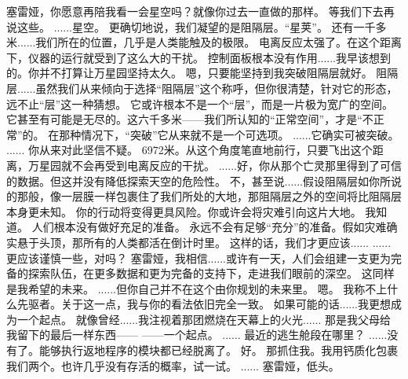 \documentclass[openany]{book}
\begin{document}
\begin{dialogue}
     塞雷娅，你愿意再陪我看一会星空吗？就像你过去一直做的那样。
     等我们下去再说这些。
     ......星空。
     更确切地说，我们凝望的是阻隔层。“星荚”。
     还有一千多米......我们所在的位置，几乎是人类能触及的极限。
     电离反应太强了。在这个距离下，仪器的运行就受到了这么大的干扰。
     控制面板根本没有作用......我早该想到的。你并不打算让万星园坚持太久。
     嗯，只要能坚持到我突破阻隔层就好。
     阻隔层......虽然我们从来倾向于选择“阻隔层”这个称呼，但你很清楚，针对它的形态，远不止“层”这一种猜想。
     它或许根本不是一个“层”，而是一片极为宽广的空间。
     它甚至有可能是无尽的。这六千多米——我们所认知的“正常空间”，才是“不正常”的。
     在那种情况下，“突破”它从来就不是一个可选项。
     ......它确实可被突破。
     ......
     你从来对此坚信不疑。
     6972米。从这个角度笔直地前行，只要飞出这个距离，万星园就不会再受到电离反应的干扰。
     ......好，你从那个亡灵那里得到了可信的数据。但这并没有降低探索天空的危险性。
     不，甚至说......假设阻隔层如你所说的那般，像一层膜一样包裹住了我们所处的大地，那阻隔层之外的空间将比阻隔层本身更未知。
     你的行动将变得更具风险。你或许会将灾难引向这片大地。
     我知道。
     人们根本没有做好充足的准备。
     永远不会有足够“充分”的准备。假如灾难确实悬于头顶，那所有的人类都活在倒计时里。
     这样的话，我们才更应该......
     ......更应该谨慎一些，对吗？
     塞雷娅，我相信......或许有一天，人们会组建一支更为完备的探索队伍，在更多数据和更为完备的支持下，走进我们眼前的深空。
     这同样是我希望的未来。
     ......但你自己并不在这个由你规划的未来里。
     嗯。
     我称不上什么先驱者。关于这一点，我与你的看法依旧完全一致。
     如果可能的话......我更想成为一个起点。
     就像曾经......我注视着那团燃烧在天幕上的火光......
     那是我父母给我留下的最后一样东西——
     ——一个起点。
     ......
     最近的逃生舱段在哪里？
     ......没有了。能够执行返地程序的模块都已经脱离了。
     好。
     那抓住我。我用钙质化包裹我们两个。也许几乎没有存活的概率，试一试。
     ......
     塞雷娅，低头。

\end{dialogue}
\end{document}
